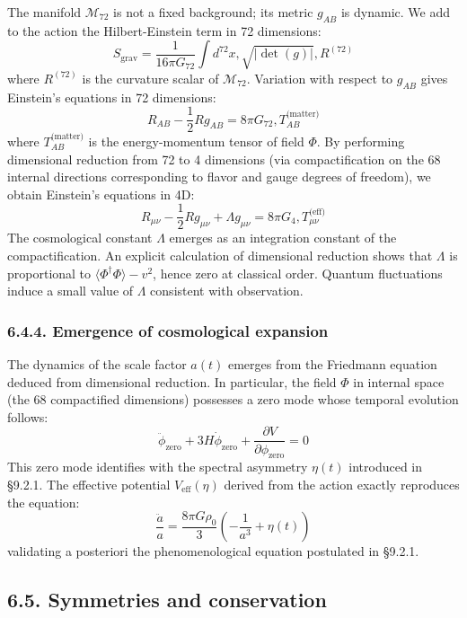 \documentclass[11pt]{article}
\let\oldmathcal\mathcal
\renewcommand{\mathcal}[1]{\oldmathcal{#1}}
\begin{document}
The manifold \(\mathcal{M}_{72}\) is not a fixed background; its metric
\(g_{AB}\) is dynamic. We add to the action the Hilbert-Einstein term in
72 dimensions: \[
S_{\text{grav}} = \frac{1}{16\pi G_{72}} \int d^{72}x , \sqrt{|\det(g)|} , R^{(72)}
\] where \(R^{(72)}\) is the curvature scalar of \(\mathcal{M}_{72}\).
Variation with respect to \(g_{AB}\) gives Einstein's equations in 72
dimensions: \[
R_{AB} - \frac{1}{2} R g_{AB} = 8\pi G_{72} , T_{AB}^{\text{(matter)}}
\] where \(T_{AB}^{\text{(matter)}}\) is the energy-momentum tensor of
field \(\Phi\). By performing dimensional reduction from 72 to 4
dimensions (via compactification on the 68 internal directions
corresponding to flavor and gauge degrees of freedom), we obtain
Einstein's equations in 4D: \[
R_{\mu\nu} - \frac{1}{2} R g_{\mu\nu} + \Lambda g_{\mu\nu} = 8\pi G_4 , T_{\mu\nu}^{\text{(eff)}}
\] The cosmological constant \(\Lambda\) emerges as an integration
constant of the compactification. An explicit calculation of dimensional
reduction shows that \(\Lambda\) is proportional to
\(\langle \Phi^\dagger \Phi \rangle - v^2\), hence zero at classical
order. Quantum fluctuations induce a small value of \(\Lambda\)
consistent with observation.

\hypertarget{emergence-of-cosmological-expansion}{%
\subsubsection{6.4.4. Emergence of cosmological
expansion}\label{emergence-of-cosmological-expansion}}

The dynamics of the scale factor \(a(t)\) emerges from the Friedmann
equation deduced from dimensional reduction. In particular, the field
\(\Phi\) in internal space (the 68 compactified dimensions) possesses a
zero mode whose temporal evolution follows: \[
\ddot{\phi}_{\text{zero}} + 3H \dot{\phi}_{\text{zero}} + \frac{\partial V}{\partial \phi_{\text{zero}}} = 0
\] This zero mode identifies with the spectral asymmetry \(\eta(t)\)
introduced in §9.2.1. The effective potential \(V_{\text{eff}}(\eta)\)
derived from the action exactly reproduces the equation: \[
\frac{\ddot{a}}{a} = \frac{8\pi G \rho_0}{3} \left( -\frac{1}{a^3} + \eta(t) \right)
\] validating a posteriori the phenomenological equation postulated in
§9.2.1.

\hypertarget{symmetries-and-conservation}{%
\subsection{6.5. Symmetries and
conservation}\label{symmetries-and-conservation}}
\end{document}
